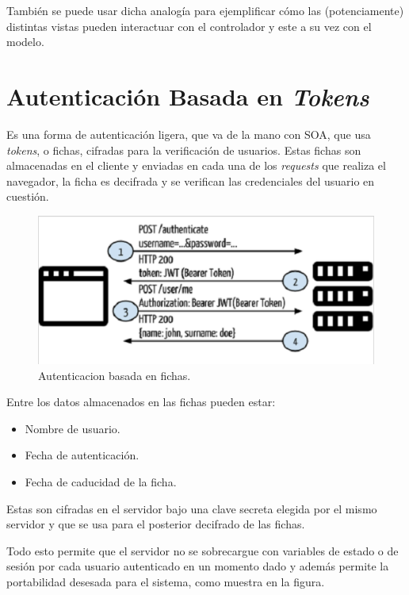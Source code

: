     También se puede usar dicha analogía para ejemplificar cómo las (potenciamente) distintas vistas pueden interactuar con el controlador y este a su vez con el modelo.


    \section{Autenticación Basada en \textit{Tokens}}
    
    Es una forma de autenticación ligera, que va de la mano con SOA, que usa \textit{tokens}, o fichas, cifradas para la verificación de usuarios. Estas fichas son almacenadas en el cliente y enviadas en cada una de los \textit{requests} que realiza el navegador, la ficha es decifrada y se verifican las credenciales del usuario en cuestión\cite{TOKEN-tokenbasedauth}.
    
    \begin{figure}
        \begin{center}
            \includegraphics[width=.8\textwidth]{figures/tokenbarequest}
        \end{center}
        \caption{Autenticacion basada en fichas.}
    \end{figure}
    
    Entre los datos almacenados en las fichas pueden estar:
    
    \begin{itemize}
        \item Nombre de usuario.
        \item Fecha de autenticación.
        \item Fecha de caducidad de la ficha.
    \end{itemize}
    
    Estas son cifradas en el servidor bajo una clave secreta elegida por el mismo servidor y que se usa para el posterior decifrado de las fichas.
    
    Todo esto permite que el servidor no se sobrecargue con variables de estado o de sesión por cada usuario autenticado en un momento dado y además permite la portabilidad desesada para el sistema, como muestra en la figura.
    
